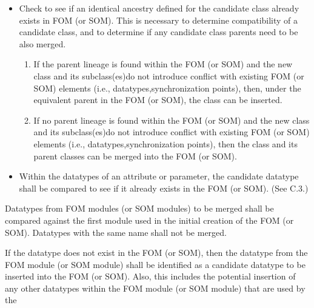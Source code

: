 \begin{itemize}[leftmargin=30pt,labelsep=9pt,itemsep=0pt,topsep=-2pt,partopsep=0pt,parsep=0pt]
\item Check to see if an identical ancestry defined for the candidate class already exists in FOM (or SOM). This is necessary to determine compatibility of a candidate class, and to determine if any candidate class parents need to be also merged.
\begin{enumerate}[label=\alph*),leftmargin=24pt,labelsep=14pt,itemsep=0pt,topsep=0pt,partopsep=0pt,parsep=0pt]
\item If the parent lineage is found within the FOM (or SOM) and the new class and its subclass(es)\linebreak do not introduce conflict with existing FOM (or SOM) elements (i.e., datatypes,\linebreak synchronization points), then, under the equivalent parent in the FOM (or SOM), the class can be inserted.
\item If no parent lineage is found within the FOM (or SOM) and the new class and its subclass(es)\linebreak do not introduce conflict with existing FOM (or SOM) elements (i.e., datatypes,\linebreak synchronization points), then the class and its parent classes can be merged into the FOM (or SOM).
\end{enumerate}
\item Within the datatypes of an attribute or parameter, the candidate datatype shall be compared to see if it already exists in the FOM (or SOM). (See C.3.)
\end{itemize}

\vspace{15pt}
Datatypes from FOM modules (or SOM modules) to be merged shall be compared against the first module used in the initial creation of the FOM (or SOM). Datatypes with the same name shall not be merged.

If the datatype does not exist in the FOM (or SOM), then the datatype from the FOM module (or SOM module) shall be identified as a candidate datatype to be inserted into the FOM (or SOM). Also, this includes the potential insertion of any other datatypes within the FOM module (or SOM module) that are used by the
\endgroup

